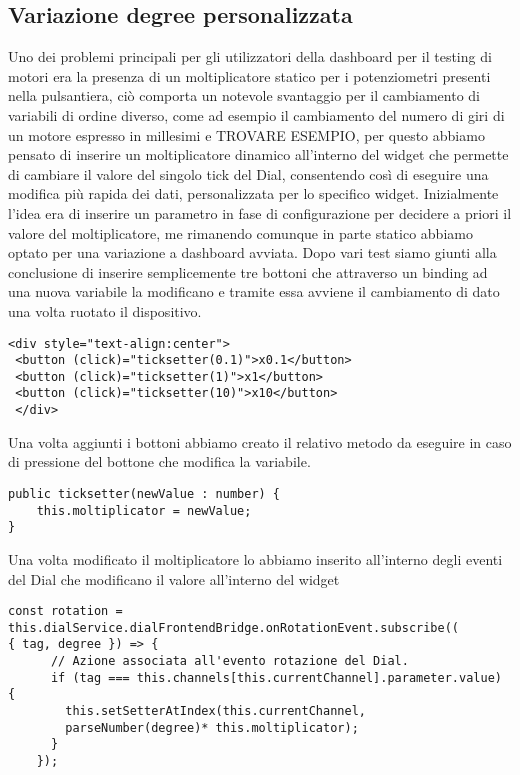 \subsection{Variazione degree personalizzata}
Uno dei problemi principali per gli utilizzatori della dashboard per il testing di motori era la presenza di un moltiplicatore statico per i potenziometri presenti nella pulsantiera, ciò comporta un notevole svantaggio per il cambiamento di variabili di ordine diverso, come ad esempio il cambiamento del numero di giri di un motore espresso in millesimi e TROVARE ESEMPIO, per questo abbiamo pensato di inserire un moltiplicatore dinamico all'interno del widget che permette di cambiare il valore del singolo tick del Dial, consentendo così di eseguire una modifica più rapida dei dati, personalizzata per lo specifico widget.
Inizialmente l'idea era di inserire un parametro in fase di configurazione per decidere a priori il valore del moltiplicatore, me rimanendo comunque in parte statico abbiamo optato per una variazione a dashboard avviata.
Dopo vari test siamo giunti alla conclusione di inserire semplicemente tre bottoni che attraverso un binding ad una nuova variabile la modificano e tramite essa avviene il cambiamento di dato una volta ruotato il dispositivo.
\vspace{1.0cm}
\begin{lstlisting}[caption={Aggiunta dei bottoni all'interno del file HTML del componente},style=javaScriptCode]
 <div style="text-align:center">
 <button (click)="ticksetter(0.1)">x0.1</button>
 <button (click)="ticksetter(1)">x1</button>
 <button (click)="ticksetter(10)">x10</button>
 </div>
\end{lstlisting} 
\vspace{1.0cm}
Una volta aggiunti i bottoni abbiamo creato il relativo metodo da eseguire in caso di pressione del bottone che modifica la variabile.
\vspace{0.5cm}
\begin{lstlisting}[caption={Modifica del moltiplicatore},style=javaScriptCode]
public ticksetter(newValue : number) {
    this.moltiplicator = newValue;
}
\end{lstlisting} 
\vspace{1.0cm}
Una volta modificato il moltiplicatore lo abbiamo inserito all'interno degli eventi del Dial che modificano il valore all'interno del widget
\vspace{1.0cm}
\begin{lstlisting}[caption={Utilizzo del moltiplicatore},style=javaScriptCode]
const rotation = 
this.dialService.dialFrontendBridge.onRotationEvent.subscribe((
{ tag, degree }) => {
      // Azione associata all'evento rotazione del Dial.
      if (tag === this.channels[this.currentChannel].parameter.value) {
        this.setSetterAtIndex(this.currentChannel, 
        parseNumber(degree)* this.moltiplicator);
      }
    });
\end{lstlisting} 
